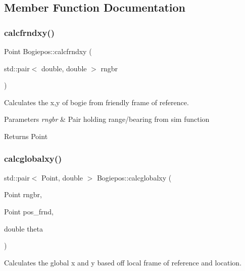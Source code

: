 \subsection{Member Function Documentation}
\mbox{\label{classBogiepos_a48fc24fe51edd4e9835a141e369d5bd4}} 
\subsubsection{\texorpdfstring{calcfrndxy()}{calcfrndxy()}}
{\footnotesize\ttfamily Point Bogiepos\+::calcfrndxy (\begin{DoxyParamCaption}\item[{std\+::pair$<$ double, double $>$}]{rngbr }\end{DoxyParamCaption})\hspace{0.3cm}{\ttfamily [protected]}}



Calculates the x,y of bogie from friendly frame of reference. 


\begin{DoxyParams}{Parameters}
{\em rngbr} & Pair holding range/bearing from sim function \\
\hline
\end{DoxyParams}
\begin{DoxyReturn}{Returns}
Point 
\end{DoxyReturn}
\mbox{\label{classBogiepos_a92af33e7edbae36591d1a564d9add2cc}} 
\subsubsection{\texorpdfstring{calcglobalxy()}{calcglobalxy()}}
{\footnotesize\ttfamily std\+::pair$<$ Point, double $>$ Bogiepos\+::calcglobalxy (\begin{DoxyParamCaption}\item[{Point}]{rngbr,  }\item[{Point}]{pos\+\_\+frnd,  }\item[{double}]{theta }\end{DoxyParamCaption})\hspace{0.3cm}{\ttfamily [protected]}}



Calculates the global x and y based off local frame of reference and location. 


